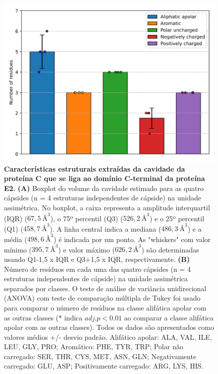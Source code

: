 \documentclass[Portugues]{phdquali}
\newcommand{\mAA}{~\text{\AA}}
\begin{document}
\begin{figure}[ht]
    \includegraphics[scale=0.5]{images/mayv-c-e2-res-dist.png}
  \caption[Características estruturais extraídas da cavidade da proteína C que se liga ao domínio C-terminal da proteína E2]{\textbf{Características estruturais extraídas da cavidade da proteína C que se liga ao domínio C-terminal da proteína E2.} \textbf{(A)} Boxplot do volume da cavidade estimado para as quatro cápsides (n = 4 estruturas independentes de cápside) na unidade assimétrica. No boxplot, a caixa representa a amplitude interquartil (IQR) ($67,5 \mAA^3$), o 75º percentil (Q3) ($526,2 \mAA^3$) e o 25º percentil (Q1) ($458,7 \mAA^3$). A linha central indica a mediana ($486,3 \mAA^3$) e a média ($498,6 \mAA^3$) é indicada por um ponto. As "whiskers" com valor mínimo ($395,7 \mAA^3$) e valor máximo ($626,2 \mAA^3$) são determinadas usando Q1-1,5 x IQR e Q3+1,5 x IQR, respectivamente. \textbf{(B)} Número de resíduos em cada uma das quatro cápsides (n = 4 estruturas independentes de cápside) na unidade assimétrica separados por classes. O teste de análise de variância unidirecional (ANOVA) com teste de comparação múltipla de Tukey foi usado para comparar o número de resíduos na classe alifática apolar com as outras classes ($*$ indica $adj. p<0.01$ ao comparar a classe alifática apolar com as outras classes). Todos os dados são apresentados como valores médios +/- desvio padrão. Alifático apolar: ALA, VAL, ILE, LEU, GLY, PRO; Aromático: PHE, TYR, TRP; Polar não carregado: SER, THR, CYS, MET, ASN, GLN; Negativamente carregado: GLU, ASP; Positivamente carregado: ARG, LYS, HIS.}
  \label{fig:mayv-c-e2-plots}
\end{figure}
\end{document}

